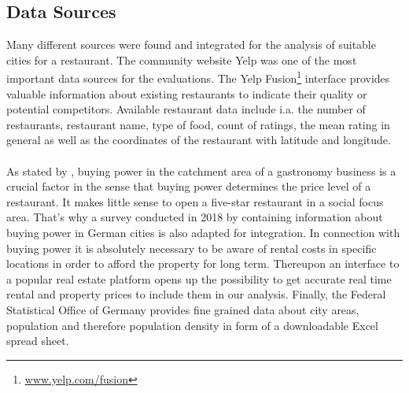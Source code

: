 \subsection{Data Sources}
\label{subsec:sources}
Many different sources were found and integrated for the analysis of suitable cities for a restaurant. The community website Yelp was one of the most important data sources for the evaluations. The Yelp Fusion\footnote{\href{https://www.yelp.com/fusion}{www.yelp.com/fusion}} interface provides valuable information about existing restaurants to indicate their quality or potential competitors. Available restaurant data include i.a. the number of restaurants, restaurant name, type of food, count of ratings, the mean rating in general as well as the coordinates of the restaurant with latitude and longitude.\\%
\\
As stated by \cite{locana}, buying power in the catchment area of a gastronomy business is a crucial factor in the sense that buying power determines the price level of a restaurant. It makes little sense to open a five-star restaurant in a social focus area. That's why a survey conducted in 2018 by \cite{buyingpower} containing information about buying power in German cities is also adapted for integration.
\newline
In connection with buying power it is absolutely necessary to be aware of rental costs in specific locations in order to afford the property for long term\cite{locana}. Thereupon an interface to a popular real estate platform \cite{ImmoScout} opens up the possibility to get accurate real time rental and property prices to include them in our analysis.
\newline
Finally, the Federal Statistical Office of Germany provides fine grained data about city areas, population and therefore population density in form of a downloadable Excel spread sheet.\cite{destatis}

